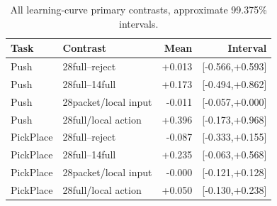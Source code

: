 \documentclass[10pt,a4paper]{article}
\begin{document}
\renewcommand{\thetable}{S\arabic{table}}
\setcounter{table}{0}
\begin{table}[H]\centering\small
\caption{All learning-curve primary contrasts, approximate 99.375\% intervals.}
\begin{tabular}{llrr}
\toprule Task & Contrast & Mean & Interval\\\midrule
Push & 28full--reject & +0.013 & [-0.566,+0.593]\\
Push & 28full--14full & +0.173 & [-0.494,+0.862]\\
Push & 28packet/local input & -0.011 & [-0.057,+0.000]\\
Push & 28full/local action & +0.396 & [-0.173,+0.968]\\
PickPlace & 28full--reject & -0.087 & [-0.333,+0.155]\\
PickPlace & 28full--14full & +0.235 & [-0.063,+0.568]\\
PickPlace & 28packet/local input & -0.000 & [-0.121,+0.128]\\
PickPlace & 28full/local action & +0.050 & [-0.130,+0.238]\\
\bottomrule\end{tabular}\end{table}
\end{document}
